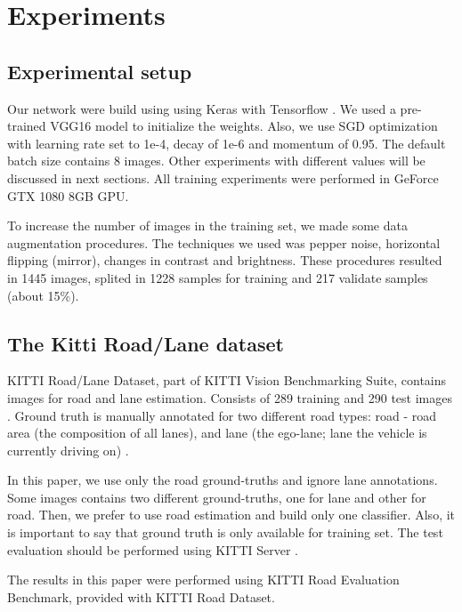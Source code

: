 \section{Experiments}
\label{sec:experiments}

\subsection{Experimental setup}
\label{sec:experimental_setup}

Our network were build using using Keras \cite{chollet2015keras} with Tensorflow \cite{tensorflow2015-whitepaper}. We used a pre-trained VGG16 model to initialize the weights. Also, we use SGD optimization with learning rate set to 1e-4, decay of 1e-6 and momentum of 0.95. The default batch size contains 8 images. Other experiments with different values will be discussed in next sections. All training experiments were performed in GeForce GTX 1080 8GB GPU.

To increase the number of images in the training set, we made some data augmentation procedures. The techniques we used was pepper noise, horizontal flipping (mirror), changes in contrast and brightness. These procedures resulted in 1445 images, splited in 1228 samples for training and 217 validate samples (about 15\%).

\subsection{The Kitti Road/Lane dataset}

KITTI Road/Lane Dataset, part of KITTI Vision Benchmarking Suite, contains  images for road and lane estimation. Consists of 289 training and 290 test images . Ground truth is manually annotated for two different road types: road - road area (the composition of all lanes), and lane (the ego-lane; lane the vehicle is currently driving on) \cite{KITTI}. 

In this paper, we use only the road ground-truths and ignore lane annotations. Some images contains two different ground-truths, one for lane and other for road. Then, we prefer to use road estimation and build only one classifier. Also, it is important to say that ground truth is only available for training set. The test evaluation should be performed using KITTI Server \cite{KITTI}. 

The results in this paper were performed using KITTI Road Evaluation Benchmark, provided with KITTI Road Dataset. %


